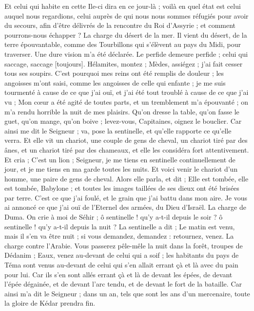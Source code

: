\begin{multicols}{2}
Et celui qui habite en cette Ile-ci dira en ce jour-là ; voilà en quel état est celui auquel nous regardions, celui auprès de qui nous nous sommes réfugiés pour avoir du secours, afin d'être délivrés de la rencontre du Roi d'Assyrie ; et comment pourrons-nous échapper ?
\VerseOne{}La charge du désert de la mer. Il vient du désert, de la terre épouvantable, comme des Tourbillons qui s'élèvent au pays du Midi, pour traverser.
Une dure vision m'a été déclarée. Le perfide demeure perfide ; celui qui saccage, saccage [toujours]. Hélamites, montez ; Mèdes, assiégez ; j'ai fait cesser tous ses soupirs.
C'est pourquoi mes reins ont été remplis de douleur ; les angoisses m'ont saisi, comme les angoisses de celle qui enfante ; je me suis tourmenté à cause de ce que j'ai ouï, et j'ai été tout troublé à cause de ce que j'ai vu ;
Mon cœur a été agité de toutes parts, et un tremblement m'a épouvanté ; on m'a rendu horrible la nuit de mes plaisirs.
Qu'on dresse la table, qu'on fasse le guet, qu'on mange, qu'on boive ; levez-vous, Capitaines, oignez le bouclier.
Car ainsi me dit le Seigneur ; va, pose la sentinelle, et qu'elle rapporte ce qu'elle verra.
Et elle vit un chariot, une couple de gens de cheval, un chariot tiré par des ânes, et un chariot tiré par des chameaux, et elle les considéra fort attentivement.
Et cria ; C'est un lion ; Seigneur, je me tiens en sentinelle continuellement de jour, et je me tiens en ma garde toutes les nuits.
Et voici venir le chariot d'un homme, une paire de gens de cheval. Alors elle parla, et dit ; Elle est tombée, elle est tombée, Babylone ; et toutes les images taillées de ses dieux ont été brisées par terre.
C'est ce que j'ai foulé, et le grain que j'ai battu dans mon aire. Je vous ai annoncé ce que j'ai ouï de l'Eternel des armées, du Dieu d'Israël.
La charge de Duma. On crie à moi de Séhir ; ô sentinelle ! qu'y a-t-il depuis le soir ? ô sentinelle ! qu'y a-t-il depuis la nuit ?
La sentinelle a dit ; Le matin est venu, mais il s'en va être nuit ; si vous demandez, demandez : retournez, venez.
La charge contre l'Arabie. Vous passerez pêle-mêle la nuit dans la forêt, troupes de Dédanim ;
Eaux, venez au-devant de celui qui a soif ; les habitants du pays de Téma sont venus au-devant de celui qui s'en allait errant çà et là avec du pain pour lui.
Car ils s'en sont allés errant çà et là de devant les épées, de devant l'épée dégainée, et de devant l'arc tendu, et de devant le fort de la bataille.
Car ainsi m'a dit le Seigneur ; dans un an, tels que sont les ans d'un mercenaire, toute la gloire de Kédar prendra fin.

\end{multicols}
